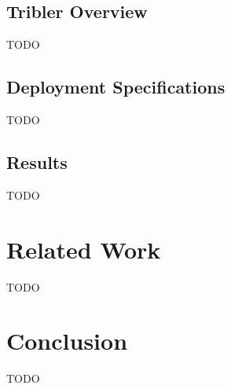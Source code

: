 \subsection{Tribler Overview}
TODO

\subsection{Deployment Specifications}
TODO

\subsection{Results}
TODO

\section{Related Work}
TODO

\section{Conclusion}
TODO

\newpage



